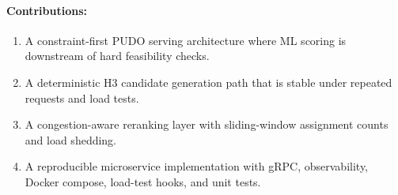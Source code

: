 \documentclass{article}
\begin{document}
\paragraph{Contributions:}
\begin{enumerate}
  \item A constraint-first PUDO serving architecture where ML scoring is downstream of hard feasibility checks.
  \item A deterministic H3 candidate generation path that is stable under repeated requests and load tests.
  \item A congestion-aware reranking layer with sliding-window assignment counts and load shedding.
  \item A reproducible microservice implementation with gRPC, observability, Docker compose, load-test hooks, and unit tests.
\end{enumerate}
\end{document}
